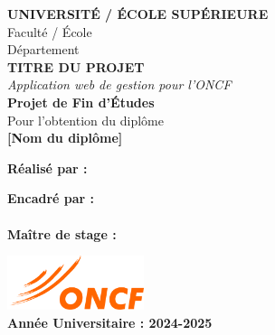 \begin{titlepage}
\centering

\vspace*{1cm}
{\Large \textbf{UNIVERSITÉ / ÉCOLE SUPÉRIEURE}} \\[0.5cm]
{\large Faculté / École} \\[0.5cm]
{\large Département} \\[2cm]

{\Huge \textbf{TITRE DU PROJET}} \\[1cm]
{\Large \textit{Application web de gestion pour l'ONCF}} \\[3cm]

{\large \textbf{Projet de Fin d'Études}} \\[0.5cm]
{\large Pour l'obtention du diplôme} \\[0.5cm]
{\large \textbf{[Nom du diplôme]}} \\[2cm]

\begin{minipage}{0.45\textwidth}
\begin{flushleft}
\textbf{Réalisé par :} \\
[Nom de l'étudiant]
\end{flushleft}
\end{minipage}
\hfill
\begin{minipage}{0.45\textwidth}
\begin{flushright}
\textbf{Encadré par :} \\
[Nom de l'encadrant] \\[0.5cm]
\textbf{Maître de stage :} \\
[Nom du maître de stage]
\end{flushright}
\end{minipage}

\vfill

\includegraphics[width=4cm]{../src/main/resources/static/images/Logo-oncf.png} \\[1cm]

{\large \textbf{Année Universitaire : 2024-2025}}

\end{titlepage}

\newpage